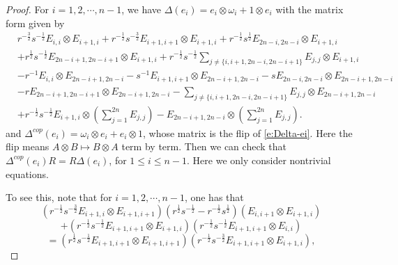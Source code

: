 \documentclass[10pt,a4paper]{amsart}
\numberwithin{equation}{section}
\begin{document}
\begin{proof}
	For $i=1,2, \cdots ,n-1$, we have $\Delta\left(e_i\right)=e_i \otimes \omega_i+1 \otimes e_i$ with the matrix form given by
\begin{equation}\label{e:Delta-ei}
\begin{aligned}
	&r^{-\frac{3}{2}} s^{-\frac{1}{2}} E_{i, i} \otimes E_{i+1, i}+r^{-\frac{1}{2}} s^{-\frac{3}{2}} E_{i+1, i+1} \otimes E_{i+1, i}+r^{-\frac{1}{2}} s^{\frac{1}{2}} E_{2 n-i, 2 n-i} \otimes E_{i+1, i}\\
	&+r^{\frac{1}{2}} s^{-\frac{1}{2}} E_{2 n-i+1,2 n-i+1} \otimes E_{i+1, i}+r^{-\frac{1}{2}} s^{-\frac{1}{2}} \sum_{j \neq\{i, i+1,2 n-i, 2 n-i+1\}} E_{j, j} \otimes E_{i+1, i}\\
	&-r^{-1} E_{i, i} \otimes E_{2 n-i+1,2 n-i}-s^{-1} E_{i+1, i+1} \otimes E_{2 n-i+1,2 n-i}-s E_{2 n-i, 2 n-i} \otimes E_{2 n-i+1,2 n-i}\\
	&-r E_{2 n-i+1,2 n-i+1} \otimes E_{2 n-i+1,2 n-i}-\sum_{j \neq\{i, i+1,2 n-i, 2 n-i+1\}} E_{j, j} \otimes E_{2 n-i+1,2 n-i}\\
	&+r^{-\frac{1}{2}} s^{-\frac{1}{2}} E_{i+1, i} \otimes\left(\sum_{j=1}^{2 n} E_{j, j}\right)-E_{2 n-i+1,2 n-i} \otimes\left(\sum_{j=1}^{2 n} E_{j, j}\right).
\end{aligned}
\end{equation}	
and $\Delta^{c o p}\left(e_i\right)=\omega_i \otimes e_i+e_i \otimes 1$, whose matrix is the flip of \eqref{e:Delta-ei}.
Here the flip means $A\otimes B\mapsto B\otimes A$ term by term.
Then we can check that
$\Delta^{c o p}\left(e_i\right) R=R \Delta\left(e_i\right)$, for $1\leq i\leq n-1$. Here we only consider nontrivial equations.

To see this, note that for $i=1,2, \cdots ,n-1$, one has that
$$
\left(r^{-\frac{1}{2}} s^{-\frac{3}{2}} E_{i+1, i} \otimes E_{i+1, i+1}\right)\left(r^{\frac{1}{2}} s^{-\frac{1}{2}}-r^{-\frac{1}{2}} s^{\frac{1}{2}}\right)\left(E_{i, i+1} \otimes E_{i+1, i}\right)
$$
$$
+\left(r^{-\frac{1}{2}} s^{-\frac{1}{2}} E_{i+1, i+1} \otimes E_{i+1, i}\right)\left(r^{-\frac{1}{2}} s^{-\frac{1}{2}} E_{i+1, i+1} \otimes E_{i, i}\right)
$$
$$
=\left(r^{\frac{1}{2}} s^{-\frac{1}{2}} E_{i+1, i+1} \otimes E_{i+1, i+1}\right)\left(r^{-\frac{1}{2}} s^{-\frac{3}{2}} E_{i+1, i+1} \otimes E_{i+1, i}\right),
$$


\end{proof}
\end{document}

